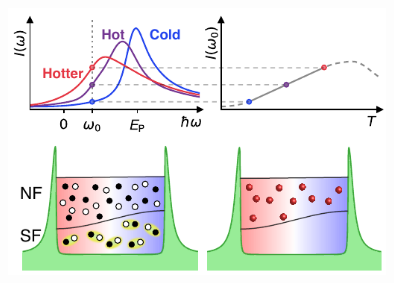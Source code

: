 \documentclass[26pt, paperwidth=36in,paperheight=48in]{tikzposter} %
\begin{document}
\begin{columns}
{		%
		\vspace{0cm}
		\begin{minipage}{0.15\textwidth}
			\includegraphics[width=10cm,
			trim=0cm 0cm 4.4cm 3.2cm,clip]{figures/local_thermometer_redone.pdf}\\
			

\end{minipage}}
\end{columns}
\end{document}
